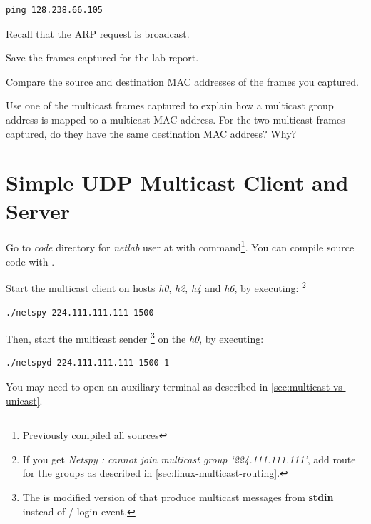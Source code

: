 \documentclass{../UTNetLab}
\begin{document}
\begin{lstlisting}
ping 128.238.66.105
\end{lstlisting}
Recall that the ARP request is broadcast.%

Save the frames captured for the lab report.

\begin{report}
    \item Compare the source and destination MAC addresses of the frames you captured.

    \item Use one of the multicast frames captured to explain how a multicast group address is mapped to a multicast MAC address.
    For the two multicast frames captured, do they have the same destination MAC address?
    Why?
\end{report}

\section{Simple UDP Multicast Client and Server}
Go to \textit{code} directory for \textit{netlab} user at  with  command\footnote{Previously compiled all sources}.
You can compile source code with .


Start the multicast client  on hosts \textit{h0}, \textit{h2}, \textit{h4} and \textit{h6}, by executing:%
\footnote{If you get \textit{Netspy : cannot join multicast group `224.111.111.111'}, add route for the groups as described in \autoref{sec:linux-multicast-routing}.}

\begin{lstlisting}
./netspy 224.111.111.111 1500
\end{lstlisting}

Then, start the multicast sender \footnote{The  is modified version of  that produce multicast messages from \textbf{stdin} instead of / login event.} on the \textit{h0}, by executing:

\begin{lstlisting}
./netspyd 224.111.111.111 1500 1
\end{lstlisting}
You may need to open an auxiliary terminal as described in \autoref{sec:multicast-vs-unicast}.
\end{document}
